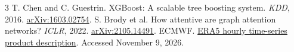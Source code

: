 \documentclass{article}
\begin{document}
\begin{thebibliography}{3}\small
{} T. Chen and C. Guestrin. XGBoost: A scalable tree boosting system.
\emph{KDD}, 2016. \href{https://arxiv.org/abs/1603.02754}{arXiv:1603.02754}.
 S. Brody et al. How attentive are graph attention
networks? \emph{ICLR}, 2022. \href{https://arxiv.org/abs/2105.14491}{arXiv:2105.14491}.
 ECMWF.
\href{https://www.ecmwf.int/en/forecasts/datasets/era5-hourly-time-series-data-single-levels-1940-present}{ERA5 hourly time-series product description}.
Accessed November 9, 2026.
\end{thebibliography}
\end{document}
